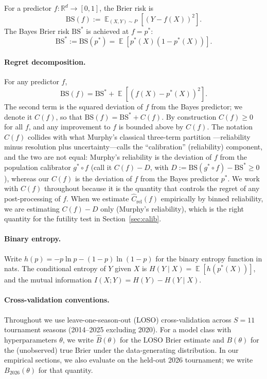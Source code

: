 \documentclass[11pt,a4paper]{article}
\theoremstyle{definition}
\DeclareMathOperator{\E}{\mathbb{E}}
\newcommand{\R}{\mathbb{R}}
\newcommand{\BS}{\mathrm{BS}}
\begin{document}
For a predictor $f: \R^d \to [0,1]$, the Brier risk is
\[
\BS(f) := \E_{(X,Y) \sim P}[(Y - f(X))^2].
\]
The Bayes Brier risk $\BS^*$ is achieved at $f = p^*$:
\[
\BS^* := \BS(p^*) = \E[p^*(X)(1 - p^*(X))].
\]

\paragraph{Regret decomposition.} For any predictor $f$,
\[
\BS(f) = \BS^* + \E[(f(X) - p^*(X))^2].
\]
The second term is the squared deviation of $f$ from the Bayes predictor; we denote it $C(f)$, so that $\BS(f) = \BS^* + C(f)$. By construction $C(f) \ge 0$ for all $f$, and any improvement to $f$ is bounded above by $C(f)$. The notation $C(f)$ collides with what Murphy's classical three-term partition \citep{murphy1973}---reliability minus resolution plus uncertainty---calls the ``calibration'' (reliability) component, and the two are not equal: Murphy's reliability is the deviation of $f$ from the population calibrator $g^* \circ f$ (call it $C(f) - D$, with $D := \BS(g^* \circ f) - \BS^* \ge 0$), whereas our $C(f)$ is the deviation of $f$ from the Bayes predictor $p^*$. We work with $C(f)$ throughout because it is the quantity that controls the regret of any post-processing of $f$. When we estimate $\hat C_{\text{rel}}(f)$ empirically by binned reliability, we are estimating $C(f) - D$ only (Murphy's reliability), which is the right quantity for the futility test in Section~\ref{sec:calib}.

\paragraph{Binary entropy.} Write $h(p) = -p \ln p - (1-p) \ln(1-p)$ for the binary entropy function in nats. The conditional entropy of $Y$ given $X$ is $H(Y \mid X) = \E[h(p^*(X))]$, and the mutual information $I(X; Y) = H(Y) - H(Y \mid X)$.

\paragraph{Cross-validation conventions.} Throughout we use leave-one-season-out (LOSO) cross-validation across $S = 11$ tournament seasons (2014--2025 excluding 2020). For a model class with hyperparameters $\theta$, we write $\hat{B}(\theta)$ for the LOSO Brier estimate and $B(\theta)$ for the (unobserved) true Brier under the data-generating distribution. In our empirical sections, we also evaluate on the held-out 2026 tournament; we write $B_{2026}(\theta)$ for that quantity.
\end{document}
